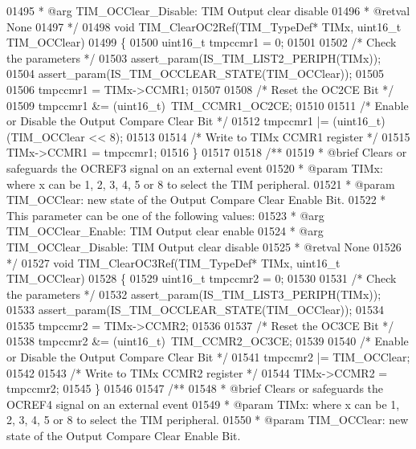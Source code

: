\begin{DoxyCode}
01495 \textcolor{comment}{  *            @arg TIM\_OCClear\_Disable: TIM Output clear disable}
01496 \textcolor{comment}{  * @retval None}
01497 \textcolor{comment}{  */}
01498 \textcolor{keywordtype}{void} TIM_ClearOC2Ref(TIM\_TypeDef* TIMx, uint16\_t TIM\_OCClear)
01499 \{
01500   uint16\_t tmpccmr1 = 0;
01501 
01502   \textcolor{comment}{/* Check the parameters */}
01503   assert_param(IS\_TIM\_LIST2\_PERIPH(TIMx));
01504   assert_param(IS\_TIM\_OCCLEAR\_STATE(TIM\_OCClear));
01505 
01506   tmpccmr1 = TIMx->CCMR1;
01507 
01508   \textcolor{comment}{/* Reset the OC2CE Bit */}
01509   tmpccmr1 &= (uint16\_t)~TIM_CCMR1_OC2CE;
01510 
01511   \textcolor{comment}{/* Enable or Disable the Output Compare Clear Bit */}
01512   tmpccmr1 |= (uint16\_t)(TIM\_OCClear << 8);
01513 
01514   \textcolor{comment}{/* Write to TIMx CCMR1 register */}
01515   TIMx->CCMR1 = tmpccmr1;
01516 \}
01517 
01518 \textcolor{comment}{/**}
01519 \textcolor{comment}{  * @brief  Clears or safeguards the OCREF3 signal on an external event}
01520 \textcolor{comment}{  * @param  TIMx: where x can be  1, 2, 3, 4, 5 or 8 to select the TIM peripheral.}
01521 \textcolor{comment}{  * @param  TIM\_OCClear: new state of the Output Compare Clear Enable Bit.}
01522 \textcolor{comment}{  *          This parameter can be one of the following values:}
01523 \textcolor{comment}{  *            @arg TIM\_OCClear\_Enable: TIM Output clear enable}
01524 \textcolor{comment}{  *            @arg TIM\_OCClear\_Disable: TIM Output clear disable}
01525 \textcolor{comment}{  * @retval None}
01526 \textcolor{comment}{  */}
01527 \textcolor{keywordtype}{void} TIM_ClearOC3Ref(TIM\_TypeDef* TIMx, uint16\_t TIM\_OCClear)
01528 \{
01529   uint16\_t tmpccmr2 = 0;
01530 
01531   \textcolor{comment}{/* Check the parameters */}
01532   assert_param(IS\_TIM\_LIST3\_PERIPH(TIMx));
01533   assert_param(IS\_TIM\_OCCLEAR\_STATE(TIM\_OCClear));
01534 
01535   tmpccmr2 = TIMx->CCMR2;
01536 
01537   \textcolor{comment}{/* Reset the OC3CE Bit */}
01538   tmpccmr2 &= (uint16\_t)~TIM_CCMR2_OC3CE;
01539 
01540   \textcolor{comment}{/* Enable or Disable the Output Compare Clear Bit */}
01541   tmpccmr2 |= TIM\_OCClear;
01542 
01543   \textcolor{comment}{/* Write to TIMx CCMR2 register */}
01544   TIMx->CCMR2 = tmpccmr2;
01545 \}
01546 
01547 \textcolor{comment}{/**}
01548 \textcolor{comment}{  * @brief  Clears or safeguards the OCREF4 signal on an external event}
01549 \textcolor{comment}{  * @param  TIMx: where x can be  1, 2, 3, 4, 5 or 8 to select the TIM peripheral.}
01550 \textcolor{comment}{  * @param  TIM\_OCClear: new state of the Output Compare Clear Enable Bit.}

\end{DoxyCode}
